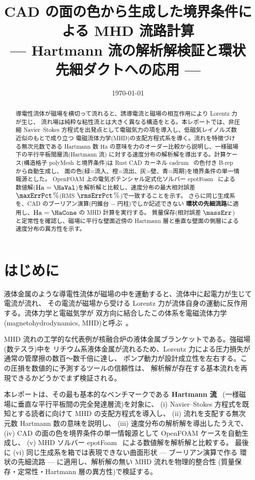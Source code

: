\documentclass{ltjsarticle}   %
\title{CAD の面の色から生成した境界条件による MHD 流路計算\\
  --- Hartmann 流の解析解検証と環状先細ダクトへの応用 ---}
\author{}
\date{\today}
\newcommand{\Ha}{\mathrm{Ha}}
\begin{document}
\maketitle

\begin{abstract}
導電性流体が磁場を横切って流れると、誘導電流と磁場の相互作用により Lorentz 力が生じ、
流れ場は純粋な粘性流とは大きく異なる構造をとる。本レポートでは、非圧縮 Navier--Stokes
方程式を出発点として電磁気力の項を導入し、低磁気レイノルズ数近似のもとで成り立つ
電磁流体力学(MHD)の支配方程式系を導く。流れを特徴づける無次元数である Hartmann 数
$\Ha$ の意味を力のオーダー比較から説明し、一様磁場下の平行平板間層流(Hartmann 流)
に対する速度分布の解析解を導出する。計算ケース(構造格子 polyMesh と境界条件)は
Rust CAD カーネル cadrum~\cite{cadrum} の色付き B-rep から自動生成し、
面の色(緑=流入、橙=流出、灰=壁、青=周期)を境界条件の単一情報源とした。
OpenFOAM 上の電気ポテンシャル定式化ソルバー epotFoam~\cite{tassone2016} による
数値解($\Ha=\HaVal$)を解析解と比較し、速度分布の最大相対誤差
$\maxErrPct\,\%$(RMS $\rmsErrPct\,\%$)で一致することを示す。
さらに同じ生成系を、CAD のブーリアン演算(円錐台 $-$ 円柱)でしか記述できない
\textbf{環状の先細流路}に適用し、$\Ha=\HaCone$ の MHD 計算を実行する。
質量保存(相対誤差 $\massErr$)と定常性を確認し、磁場に平行な壁面近傍の
Hartmann 層と垂直な壁面の側層による速度分布の異方性を示す。
\end{abstract}

\section{はじめに}

液体金属のような導電性流体が磁場の中を運動すると、流体中に起電力が生じて電流が流れ、
その電流が磁場から受ける Lorentz 力が流体自身の運動に反作用する。流体力学と電磁気学が
双方向に結合したこの体系を電磁流体力学(magnetohydrodynamics, MHD)と呼ぶ~\cite{moreau1990}。

MHD 流れの工学的な代表例が核融合炉の液体金属ブランケットである。強磁場(数テスラ)中を
リチウム系液体金属が流れるため、Lorentz 力による圧力損失が通常の管摩擦の数百〜数千倍に達し、
ポンプ動力が設計成立性を左右する。この圧損を数値的に予測するツールの信頼性は、
解析解が存在する基本流れを再現できるかどうかでまず検証される。

本レポートは、その最も基本的なベンチマークである \textbf{Hartmann 流}~\cite{hartmann1937}
(一様磁場に垂直な平行平板間の完全発達層流)を対象に、
(i) Navier--Stokes 方程式を既知とする読者に向けて MHD の支配方程式を導入し、
(ii) 流れを支配する無次元数 Hartmann 数の意味を説明し、
(iii) 速度分布の解析解を導出したうえで、
(iv) CAD の面の色を境界条件の単一情報源として OpenFOAM ケースを自動生成し、
(v) MHD ソルバー epotFoam~\cite{tassone2016} による数値解を解析解と比較する。
最後に (vi) 同じ生成系を箱では表現できない曲面形状 --- ブーリアン演算で作る
環状の先細流路 --- に適用し、解析解の無い MHD 流れを物理的整合性
(質量保存・定常性・Hartmann 層の異方性)で検証する。
\end{document}
